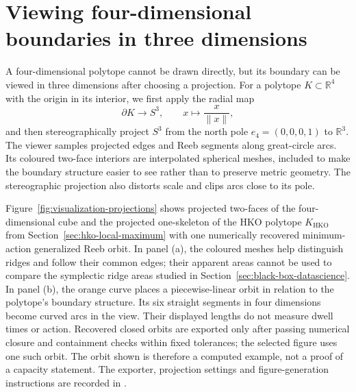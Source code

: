 \section{Viewing four-dimensional boundaries in three dimensions}
\label{sec:visualization-3d}

A four-dimensional polytope cannot be drawn directly, but its boundary can be
viewed in three dimensions after choosing a projection.  For a polytope
\(K\subset\mathbb R^4\) with the origin in its interior, we first apply the
radial map
\[
  \partial K\longrightarrow S^3,
  \qquad x\longmapsto \frac{x}{\lVert x\rVert},
\]
and then stereographically project \(S^3\) from the north pole
\(e_4=(0,0,0,1)\) to \(\mathbb R^3\).  The viewer samples projected edges and
Reeb segments along great-circle arcs.  Its coloured two-face interiors are
interpolated spherical meshes, included to make the boundary structure easier
to see rather than to preserve metric geometry.  The stereographic projection
also distorts scale and clips arcs close to its pole.

Figure~\ref{fig:visualization-projections} shows projected two-faces of the
four-dimensional cube and the projected one-skeleton of the HKO polytope
\(K_{\mathrm{HKO}}\) from Section~\ref{sec:hko-local-maximum} with one
numerically recovered minimum-action generalized Reeb orbit. In panel (a),
the coloured meshes help distinguish ridges and follow their common edges;
their apparent areas cannot be used to compare the symplectic ridge areas
studied in Section~\ref{sec:black-box-datascience}. In panel (b), the orange
curve places a piecewise-linear orbit in relation to the polytope's boundary
structure. Its six straight segments in four dimensions become curved arcs
in the view. Their displayed lengths do not measure dwell times or action.
Recovered closed orbits are exported only after passing numerical closure
and containment checks within fixed tolerances; the selected figure uses one
such orbit. The orbit shown is therefore a computed example, not
a proof of a capacity statement. The exporter, projection settings and
figure-generation instructions are recorded in
.

